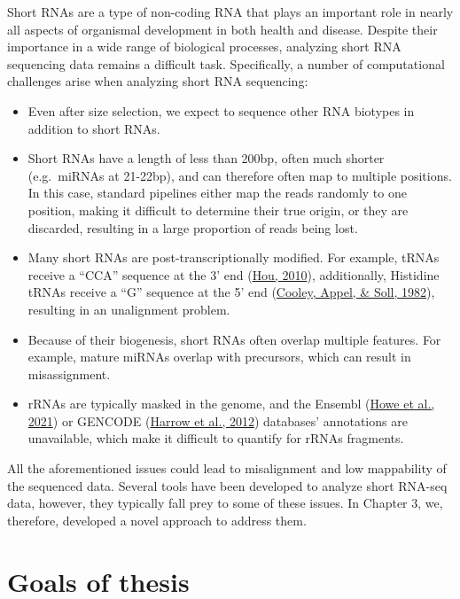 \documentclass[12pt,twoside]{reedthesis}
\begin{document}
Short RNAs are a type of non-coding RNA that plays an important role in
nearly all aspects of organismal development in both health and disease.
Despite their importance in a wide range of biological processes,
analyzing short RNA sequencing data remains a difficult task.
Specifically, a number of computational challenges arise when analyzing
short RNA sequencing:~
\begin{itemize}
\item
  Even after size selection, we expect to sequence other RNA biotypes
  in addition to short RNAs.
\item
  Short RNAs have a length of less than 200bp, often much shorter
  (e.g.~miRNAs at 21-22bp), and can therefore often map to multiple
  positions. In this case, standard pipelines either map the reads
  randomly to one position, making it difficult to determine their
  true origin, or they are discarded, resulting in a large proportion
  of reads being lost.
\item
  Many short RNAs are post-transcriptionally modified. For example,
  tRNAs receive a ``CCA'' sequence at the 3' end (\protect\hyperlink{ref-hou2010}{Hou, 2010}),
  additionally, Histidine tRNAs receive a ``G'' sequence at the 5' end
  (\protect\hyperlink{ref-cooley1982}{Cooley, Appel, \& Soll, 1982}), resulting in an unalignment problem.
\item
  Because of their biogenesis, short RNAs often overlap multiple
  features. For example, mature miRNAs overlap with precursors, which
  can result in misassignment.
\item
  rRNAs are typically masked in the genome, and the Ensembl
  (\protect\hyperlink{ref-howe2021}{Howe et al., 2021}) or GENCODE (\protect\hyperlink{ref-harrow2012}{Harrow et al., 2012}) databases' annotations are
  unavailable, which make it difficult to quantify for rRNAs
  fragments.
\end{itemize}
All the aforementioned issues could lead to misalignment and low
mappability of the sequenced data. Several tools have been developed to
analyze short RNA-seq data, however, they typically fall prey to some of
these issues. In Chapter 3, we, therefore, developed a novel approach to
address them.

\hypertarget{goals-of-thesis}{%
\section*{Goals of thesis}\label{goals-of-thesis}}
\end{document}
